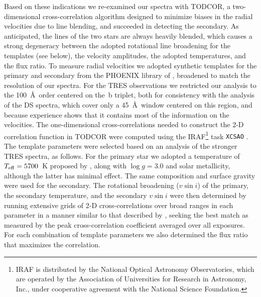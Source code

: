 \documentclass[twocolumn]{aastex61}
\begin{document}
Based on these indications we re-examined our spectra with TODCOR, a two-dimensional cross-correlation algorithm designed to minimize biases in the radial velocities due to line blending, and succeeded in detecting the secondary. As anticipated, the lines of the two stars are always heavily blended, which causes a strong degeneracy between the adopted rotational line broadening for the templates (see below), the velocity amplitudes, the adopted temperatures, and the flux ratio. To measure radial velocities we adopted synthetic templates for the primary and secondary from the PHOENIX library of \cite{husser13}, broadened to match the resolution of our spectra. For the TRES observations we restricted our analysis to the 100~\AA\ order centered on the \,b triplet, both for consistency with the analysis of the DS spectra, which cover only a 45~\AA\ window centered on this region, and because experience shows that it contains most of the information on the velocities. The one-dimensional cross-correlations needed to construct the 2-D correlation function in TODCOR were computed using the IRAF\footnote{IRAF is distributed by the National Optical Astronomy Observatories, which are operated by the Association of Universities for Research in Astronomy, Inc., under cooperative agreement with the National Science Foundation.} task {\tt XCSAO} \citep{kurtz98}. The template parameters were selected based on an analysis of the stronger TRES spectra, as follows. For the primary star we adopted a temperature of $T_{\rm eff} = 5700$~K proposed by \cite{mathieu91}, along with $\log g = 3.0$ and solar metallicity, although the latter has minimal effect. The same composition and surface gravity were used for the secondary.
The rotational broadening ($v \sin i$) of the primary, the secondary temperature, and the secondary $v \sin i$ were then determined by running extensive grids of 2-D cross-correlations over broad ranges in each parameter in a manner similar to that described by \cite{torres02}, seeking the best match as measured by the peak cross-correlation coefficient averaged over all exposures. For each combination of template parameters we also determined the flux ratio that maximizes the correlation.
\end{document}
